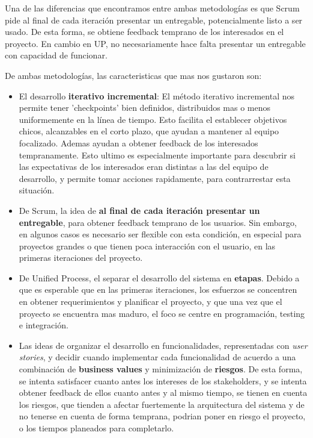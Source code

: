	Una de las diferencias que encontramos entre ambas metodologías es que Scrum pide al final de cada iteración presentar un entregable, potencialmente listo a ser usado. De esta forma, se obtiene feedback temprano de los interesados en el proyecto. En cambio en UP, no necesariamente hace falta presentar un entregable con capacidad de funcionar.

	De ambas metodologías, las caracteristicas que mas nos gustaron son:

	\begin{itemize}
		\item El desarrollo \textbf{iterativo incremental}: El método iterativo incremental nos permite tener 'checkpoints' bien definidos, distribuidos mas o menos uniformemente en la línea de tiempo. Esto facilita el establecer objetivos chicos, alcanzables en el corto plazo, que ayudan a mantener al equipo focalizado. Ademas ayudan a obtener feedback de los interesados tempranamente. Esto ultimo es especialmente importante para descubrir si las expectativas de los interesados eran distintas a las del equipo de desarrollo, y permite tomar acciones rapidamente, para contrarrestar esta situación.

		\item De Scrum, la idea de \textbf{al final de cada iteración presentar un entregable}, para obtener feedback temprano de los usuarios. Sin embargo, en algunos casos es necesario ser flexible con esta condición, en especial para proyectos grandes o que tienen poca interacción con el usuario, en las primeras iteraciones del proyecto.

		\item De Unified Process, el separar el desarrollo del sistema en \textbf{etapas}. Debido a que es esperable que en las primeras iteraciones, los esfuerzos se concentren en obtener requerimientos y planificar el proyecto, y que una vez que el proyecto se encuentra mas maduro, el foco se centre en programación, testing e integración.

		\item Las ideas de organizar el desarrollo en funcionalidades, representadas con \emph{user stories}, y decidir cuando implementar cada funcionalidad de acuerdo a una combinación de \textbf{business values} y minimización de \textbf{riesgos}. De esta forma, se intenta satisfacer cuanto antes los intereses de los stakeholders, y se intenta obtener feedback de ellos cuanto antes y al mismo tiempo, se tienen en cuenta los riesgos, que tienden a afectar fuertemente la arquitectura del sistema y de no tenerse en cuenta de forma temprana, podrian poner en riesgo el proyecto, o los tiempos planeados para completarlo.


\end{itemize}
